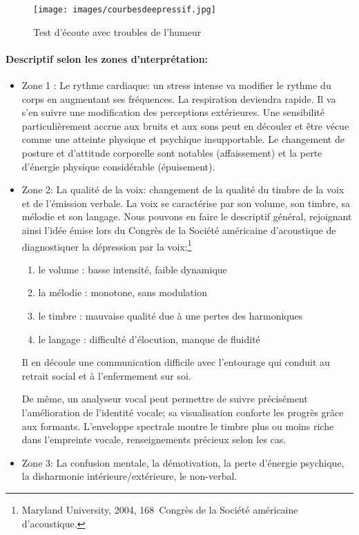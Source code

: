 \begin{figure}[ht]
	\centering
	\texttt{[image: images/courbesdeepressif.jpg]}
	\caption{Test d'écoute avec troubles de l'humeur}
	\label{fig:courbes du dépressif}
\end{figure}


\paragraph{Descriptif selon les zones d'nterprétation:}

\begin{itemize}
	\item Zone 1 :  Le rythme cardiaque: un stress intense va modifier le rythme
	du corps en augmentant ses fréquences. La respiration deviendra
	rapide. Il va s'en suivre une modification des perceptions
	extérieures. Une sensibilité particulièrement accrue aux bruits et
	aux sons peut en découler et être vécue comme une
	atteinte physique et psychique insupportable.
	Le changement de posture et d'attitude corporelle sont
	notables (affaissement) et la perte d'énergie physique considérable (épuisement).
	\item Zone 2: La qualité de la voix: changement de la qualité du timbre de la
	voix et de l'émission verbale.
	La voix se caractérise par son volume, son timbre, sa mélodie et son
	langage. Nous pouvons en faire le
	descriptif général, rejoignant ainsi l'idée émise lors du Congrès de la Société
	américaine d'acoustique \autocite{le_service_metronews}
	de diagnostiquer la
	dépression par la voix:\footnote{Maryland University, 2004, 168\ieme\ Congrès de la Société
		américaine d'acoustique.}
		\begin{enumerate}
		\item le volume : basse intensité, faible dynamique
		\item la mélodie : monotone, sans modulation
		\item le timbre : mauvaise qualité due à une pertes des harmoniques
		\item le langage : difficulté d'élocution, manque de fluidité
	\end{enumerate}
	Il en découle une communication difficile avec l'entourage qui
	conduit au retrait social et à l'enfermement sur soi.
	
	De même, un analyseur vocal peut permettre de suivre précisément l'amélioration de
	l'identité vocale; sa visualisation conforte les progrès grâce aux
	formants. L'enveloppe spectrale montre le timbre plus ou moins riche
	dans l'empreinte vocale, renseignements précieux selon les cas.
	
	\item Zone 3: La confusion mentale, la démotivation, la perte d'énergie
	psychique, la disharmonie intérieure/extérieure, le non-verbal.
\end{itemize}


